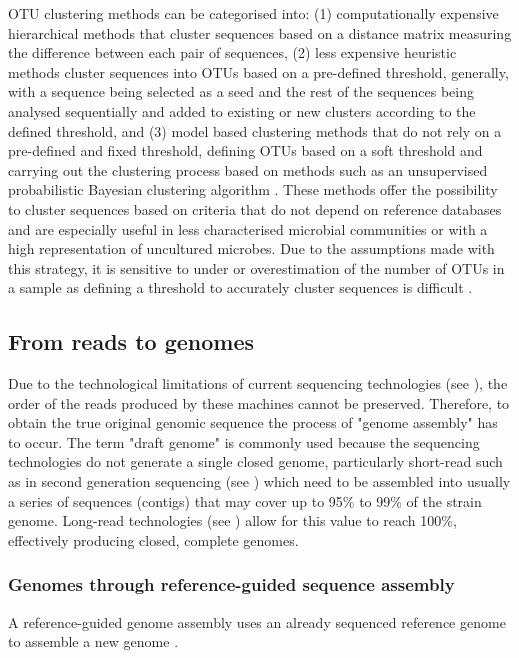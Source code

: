 OTU clustering methods can be categorised into: (1) computationally expensive hierarchical methods that cluster sequences based on a distance matrix measuring the difference between each pair of sequences, (2) less expensive heuristic methods cluster sequences into OTUs based on a pre-defined threshold, generally, with a sequence being selected as a seed and the rest of the sequences being analysed sequentially and added to existing or new clusters according to the defined threshold, and (3) model based clustering methods that do not rely on a pre-defined and fixed threshold, defining OTUs based on a soft threshold and carrying out the clustering process based on methods such as an unsupervised probabilistic Bayesian clustering algorithm \citep{hao_clustering_2011}. These methods offer the possibility to cluster sequences based on criteria that do not depend on reference databases and are especially useful in less characterised microbial communities or with a high representation of uncultured microbes. Due to the assumptions made with this strategy, it is sensitive to under or overestimation of the number of OTUs in a sample as defining a threshold to accurately cluster sequences is difficult \citep{westcott_novo_2015}.

\subsection{From reads to genomes}

Due to the technological limitations of current sequencing technologies (see ), the order of the reads produced by these machines cannot be preserved. Therefore, to obtain the true original genomic sequence the process of "genome assembly" has to occur. The term "draft genome" is commonly used because the sequencing technologies do not generate a single closed genome, particularly short-read such as in second generation sequencing (see ) which need to be assembled into usually a series of sequences (contigs) that may cover up to 95\% to 99\% of the strain genome. Long-read technologies (see ) allow for this value to reach 100\%, effectively producing closed, complete genomes.

\subsubsection{Genomes through reference-guided sequence assembly}

A reference-guided genome assembly uses an already sequenced reference genome to assemble a new genome \citep{}. 

